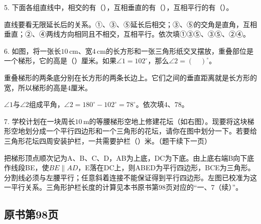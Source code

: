 5. 下面各组直线中，相交的有（\hspace{1.8em}），互相垂直的有（\hspace{1.8em}），互相平行的有（\hspace{1.8em}）。\par
{}
\begin{BookAnswer}
直线要看无限延长后的关系。①、③、⑤延长后相交；③、⑤的交角是直角，互相垂直；②、④两线方向相同且不相交，互相平行。依次填①③⑤、③⑤、②④。
\end{BookAnswer}

6. 如图，将一张长\(10\,\mathrm{cm}\)、宽\(4\,\mathrm{cm}\)的长方形和一张三角形纸交叉摆放，重叠部位是一个梯形，它的高是（\hspace{1.8em}）厘米。如果\(\angle1=102^\circ\)，那么\(\angle2=(\quad)^\circ\)。\par
{}
\begin{BookAnswer}
重叠梯形的两条底分别在长方形的两条长边上。它们之间的垂直距离就是长方形的宽，所以梯形的高是\(4\)厘米。\par \(\angle1\)与\(\angle2\)组成平角，\allowbreak{}\(\angle2=180^\circ-102^\circ=78^\circ\)。依次填\(4\)、\(78\)。
\end{BookAnswer}

7. 学校计划在一块周长\(10\,\mathrm m\)的等腰梯形空地上修建花坛（如右图）。现要将这块梯形空地划分成一个平行四边形和一个三角形的花坛，请你在图中划分一下。若要给三角形花坛四周安装护栏，一共需要护栏（\hspace{1.8em}）米。（题干续下一页）\par
{}
\begin{BookAnswer}
把梯形顶点顺次记为A、B、C、D，AB为上底，DC为下底。由上底右端B向下底作线段BE，使\(BE\parallel AD\)，E落在DC上，则ABED为平行四边形，BCE为三角形。分割线必须与左腰平行；任意斜着连接不能保证得到平行四边形。左图已校准为这一平行关系。三角形护栏长度的计算见本书原书第98页对应的“一、7（续）”。
\end{BookAnswer}



\subsection*{原书第98页}

